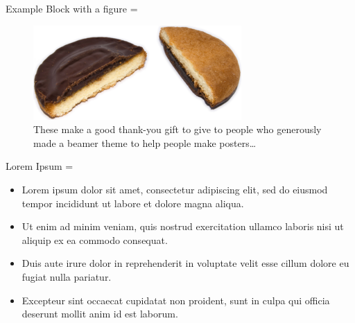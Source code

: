 \documentclass[final,hyperref={pdfpagelabels=false}]{beamer}
\newcommand{\correctitemizeindent}{\setlength{\leftmargini}{2.5em}}
\begin{document}
\begin{frame}
\begin{columns}[T]
\begin{column}{.32\textwidth}
\begin{minipage}[t]{.95\textwidth}
{			\begin{rightColumnBlock}{Example Block with a figure}
				\correctitemizeindent
				\rightskip=\leftskip
				\begin{center}
				\begin{minipage}{0.95\textwidth}
				\begin{figure} \label{fig:memory-transform}
					\begin{center}
						\includegraphics[width=\textwidth]{graphics/jaffa_cake}
					\end{center}
				\caption{These make a good thank-you gift to give to people who generously made a beamer theme to help people make posters\dots}
				\end{figure}
				\end{minipage}
				\end{center}				
			\end{rightColumnBlock}
			
			\vfill
			
			\begin{rightColumnBlock}{Lorem Ipsum}
			\rightskip=\leftskip
			{\correctitemizeindent
			\begin{itemize}
				\item Lorem ipsum dolor sit amet, consectetur adipiscing elit, sed do eiusmod tempor incididunt ut labore et dolore magna aliqua.
				\item Ut enim ad minim veniam, quis nostrud exercitation ullamco laboris nisi ut aliquip ex ea commodo consequat.
				\item Duis aute irure dolor in reprehenderit in voluptate velit esse cillum dolore eu fugiat nulla pariatur.
				\item Excepteur sint occaecat cupidatat non proident, sunt in culpa qui officia deserunt mollit anim id est laborum.
			\end{itemize}
			}
			\end{rightColumnBlock}
			
}
\end{minipage}
\end{column}
\end{columns}
\end{frame}
\end{document}
